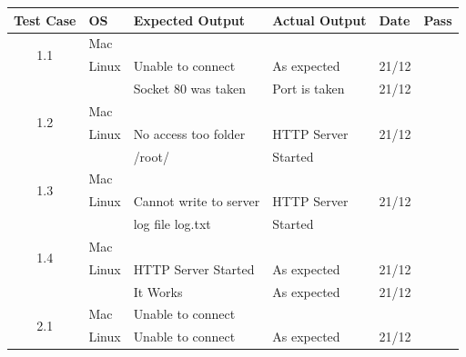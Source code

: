 \documentclass[a4paper, 12pt]{article}
\newcommand{\cmark}{\ding{51}}%
\newcommand{\xmark}{\ding{55}}%
\begin{document}
\begin{tabular}{| c | l | l | l | l | c |}
\hline

Test Case 				& OS			& Expected Output			& Actual Output			& Date			& Pass		\\ \hline
\multirow{2}{*}{1.1}	& Mac		&									&								&					&	\cmark			\\ \cline{2-6}
							& Linux		& Unable to connect		& As expected			& 21/12			& \cmark	\\			 						&				& Socket 80 was taken	& Port is taken			& 21/12			& \xmark
\\ \hline
\multirow{2}{*}{1.2}	& Mac		&									&								&					&				\\ \cline{2-6}
							& Linux		& No access too folder	&	HTTP Server			& 21/12			&	\xmark			\\ 
							&				&	/root/							& Started					&					&				\\ \hline
\multirow{2}{*}{1.3}	& Mac		&									&								&					&				\\ \cline{2-6}
							& Linux		& Cannot write to server	& HTTP Server			& 21/12			&	\xmark			\\ 
							&				& log file log.txt				&	Started					&					&			\\ \hline
\multirow{2}{*}{1.4}	& Mac		&									&								&					&				\\ \cline{2-6}
							& Linux		& HTTP Server Started	& As expected			& 21/12			& \cmark			\\ 
							&				& It Works						& As expected			& 21/12			& \cmark \\ \hline
\multirow{2}{*}{2.1}	& Mac		&	Unable to connect		&								&					&				\\ \cline{2-6}
							& Linux		& Unable to connect		& As expected			& 21/12			& \cmark				\\ \hline


\end{tabular}
\end{document}
